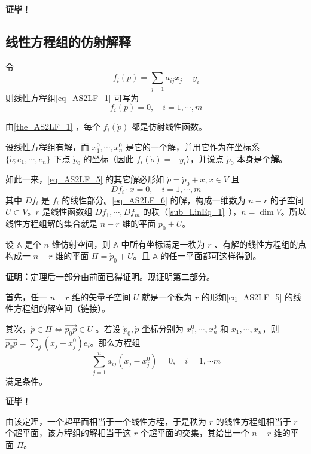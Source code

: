 \textbf{证毕！}
\subsection{线性方程组的仿射解释}
令
\begin{equation}\label{eq_AS2LF_7}
f_i(\dot p)=\sum_{j=1}a_{ij}x_j-y_i
\end{equation}
则线性方程组\autoref{eq_AS2LF_1} 可写为
\begin{equation}\label{eq_AS2LF_5}
f_i(\dot p)=0,\quad i=1,\cdots,m
\end{equation}

由\autoref{the_AS2LF_1} ，每个 $f_i(\dot p)$ 都是仿射线性函数。

设线性方程组有解，而 $x_1^0,\cdots,x_n^0$ 是它的一个解，并用它作为在坐标系 $\{\dot o;e_1,\cdots,e_n\}$ 下点 $\dot p_0$ 的坐标（因此 $f_i(\dot o)=-y_i$），并说点 $\dot p_0$ 本身是个\textbf{解}。

如此一来，\autoref{eq_AS2LF_5} 的其它解必形如 $\dot p=\dot p_0+x, x\in V$ 且
\begin{equation}\label{eq_AS2LF_6}
 Df_i \cdot x=0,\quad i=1,\cdots,m
\end{equation}
其中 $Df_i$ 是 $f_i$ 的线性部分。\autoref{eq_AS2LF_6} 的解，构成一维数为 $n-r$ 的子空间 $U\subset V$。$r$ 是线性函数组 $Df_1,\cdots,Df_m$ 的秩（\autoref{sub_LinEq_1}~），$n=\dim V$。所以线性方程组解的集合就是 $n-r$ 维的平面 $\dot p_0+U$。

\begin{theorem}{}
设 $\mathbb A$ 是个 $n$ 维仿射空间，则 $\mathbb A$ 中所有坐标满足一秩为 $r$ 、有解的线性方程组的点构成一 $n-r$ 维的平面 $\Pi=\dot p_0+U$。且 $\mathbb A$ 的任一平面都可这样得到。
\end{theorem}
\textbf{证明：}定理后一部分由前面已得证明。现证明第二部分。

首先，任一 $n-r$ 维的矢量子空间 $U$ 就是一个秩为 $r$ 的形如\autoref{eq_AS2LF_5}  的线性方程组的解空间（链接）。

其次，$\dot p\in\Pi\Leftrightarrow\vec{p_0p}\in U$ 。若设 $\dot p_0,\dot p$ 坐标分别为 $x^0_1,\cdots,x^0_n$ 和 $x_1,\cdots,x_n$，则 $\vec{p_0p}=\sum_{j}(x_j-x^0_j)e_i$。那么方程组
\begin{equation}
\sum_{j=1}^n a_{ij}(x_j-x_j^0)=0,\quad i=1,\cdots m
\end{equation}
 满足条件。

 \textbf{证毕！}

由该定理，一个超平面相当于一个线性方程，于是秩为 $r$ 的线性方程组相当于 $r$ 个超平面，该方程组的解相当于这 $r$ 个超平面的交集，其给出一个 $n-r$ 维的平面 $\Pi$。
